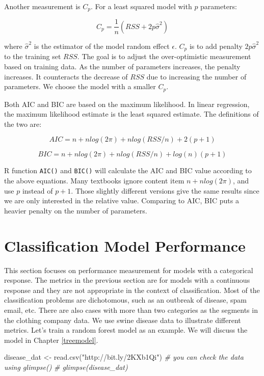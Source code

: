 \documentclass[
  12pt,
]{krantz}
\makeatletter
\newenvironment{Shaded}{\begin{snugshade}}{\end{snugshade}}
\newcommand{\CommentTok}[1]{\textcolor[rgb]{0.37,0.37,0.37}{\textit{#1}}}
\newcommand{\FunctionTok}[1]{\textcolor[rgb]{0,0,0}{#1}}
\newcommand{\NormalTok}[1]{#1}
\newcommand{\OtherTok}[1]{\textcolor[rgb]{0.37,0.37,0.37}{#1}}
\newcommand{\StringTok}[1]{\textcolor[rgb]{0.5,0.5,0.5}{#1}}
\newenvironment{kframe}{%
\medskip{}
\setlength{\fboxsep}{.8em}
 \def\at@end@of@kframe{}%
 \ifinner\ifhmode%
  \def\at@end@of@kframe{\end{minipage}}%
  \begin{minipage}{\columnwidth}%
 \fi\fi%
 \def\FrameCommand##1{\hskip\@totalleftmargin \hskip-\fboxsep
 \colorbox{shadecolor}{##1}\hskip-\fboxsep
     \hskip-\linewidth \hskip-\@totalleftmargin \hskip\columnwidth}%
 \MakeFramed {\advance\hsize-\width
   \@totalleftmargin\z@ \linewidth\hsize
   \@setminipage}}%
 {\par\unskip\endMakeFramed%
 \at@end@of@kframe}
\renewenvironment{Shaded}{\begin{kframe}}{\end{kframe}}
\makeatother
\begin{document}
Another measurement is \(C_{p}\). For a least squared model with \(p\) parameters:

\[C_{p}=\frac{1}{n}(RSS+2p\hat{\sigma}^{2})\]

where \(\hat{\sigma}^{2}\) is the estimator of the model random effect \(\epsilon\). \(C_{p}\) is to add penalty \(2p\hat{\sigma}^{2}\) to the training set \(RSS\). The goal is to adjust the over-optimistic measurement based on training data. As the number of parameters increases, the penalty increases. It counteracts the decrease of \(RSS\) due to increasing the number of parameters. We choose the model with a smaller \(C_{p}\).

Both AIC and BIC are based on the maximum likelihood. In linear regression, the maximum likelihood estimate is the least squared estimate. The definitions of the two are:

\[AIC=n+nlog(2\pi)+nlog(RSS/n)+2(p+1)\]

\[BIC=n+nlog(2\pi)+nlog(RSS/n)+log(n)(p+1)\]

R function \texttt{AIC()} and \texttt{BIC()} will calculate the AIC and BIC value according to the above equations. Many textbooks ignore content item \(n+nlog(2\pi)\), and use \(p\) instead of \(p+1\). Those slightly different versions give the same results since we are only interested in the relative value. Comparing to AIC, BIC puts a heavier penalty on the number of parameters.

\hypertarget{classification-model-performance}{%
\section{Classification Model Performance}\label{classification-model-performance}}

This section focuses on performance measurement for models with a categorical response. The metrics in the previous section are for models with a continuous response and they are not appropriate in the context of classification. Most of the classification problems are dichotomous, such as an outbreak of disease, spam email, etc. There are also cases with more than two categories as the segments in the clothing company data. We use swine disease data to illustrate different metrics. Let's train a random forest model as an example. We will discuss the model in Chapter \ref{treemodel}.

\begin{Shaded}
\begin{Highlighting}[]
\NormalTok{disease\_dat }\OtherTok{\textless{}{-}} \FunctionTok{read.csv}\NormalTok{(}\StringTok{"http://bit.ly/2KXb1Qi"}\NormalTok{)}
\CommentTok{\# you can check the data using glimpse()}
\CommentTok{\# glimpse(disease\_dat)}
\end{Highlighting}
\end{Shaded}
\end{document}
